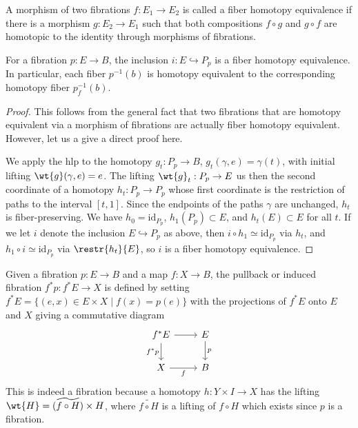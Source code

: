 \begin{defn}
    A morphism of two fibrations $f:E_1\to E_2$ is called a fiber homotopy equivalence if there is a morphism $g:E_2\to E_1$ such that both compositions $f\circ g$ and $g\circ f$ are homotopic to the identity through morphisms of fibrations.
\end{defn}

\begin{prop}
    For a fibration $p:E\to B$, the inclusion $i:E\hookrightarrow P_p$ is a fiber homotopy equivalence. In particular, each fiber $p^{-1}(b)$ is homotopy equivalent to the corresponding homotopy fiber $p_f^{-1}(b)$.
\end{prop}
\begin{proof}
    This follows from the general fact that two fibrations that are homotopy equivalent via a morphism of fibrations are actually fiber homotopy equivalent. However, let us a give a direct proof here.

    We apply the \gls{hlp} to the homotopy $g_t:P_p\to B$, $g_t(\gamma,e)=\gamma(t)$, with initial lifting $\wt{g}(\gamma,e)=e$. The lifting $\wt{g}_t:P_p\to E$ us then the second coordinate of a homotopy $h_t:P_p\to P_p$ whose first coordinate is the restriction of paths to the interval $[t,1]$. Since the endpoints of the paths $\gamma$ are unchanged, $h_t$ is fiber-preserving. We have $h_0=\mathrm{id}_{P_p}$, $h_1(P_p)\subset E$, and $h_t(E)\subset E$ for all $t$. If we let $i$ denote the inclusion $E\hookrightarrow P_p$ as above, then $i\circ h_1\simeq \mathrm{id}_{P_p}$ via $h_t$, and $h_1\circ i\simeq \mathrm{id}_{P_p}$ via $\restr{h_t}{E}$, so $i$ is a fiber homotopy equivalence.
\end{proof}

\begin{defn}
    Given a fibration $p:E\to B$ and a map $f:X\to B$, the pullback or induced fibration $f^\ast p:f^\ast E\to X$ is defined by setting $f^\ast E=\{(e,x)\in E\times X\mid f(x)=p(e)\}$ with the projections of $f^\ast E$ onto $E$ and $X$ giving a commutative diagram
    \[
    \begin{tikzcd}[every matrix/.append style={name=m}]
       f^\ast E \arrow[d,"f^\ast p",swap]\arrow[r]& E\arrow[d,"p"]\\
       X\arrow[r,"f",swap] & B
    \end{tikzcd}
    \]
    This is indeed a fibration because a homotopy $h:Y\times I\to X$ has the lifting $\wt{H}=(\widetilde{f\circ H})\times H$, where $\widetilde{f\circ H}$ is a lifting of $f\circ H$ which exists since $p$ is a fibration. 
\end{defn}


